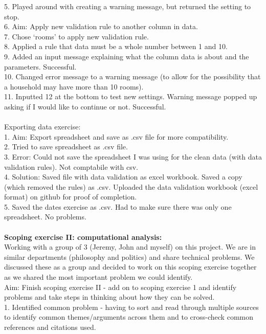 \documentclass{article}
\begin{document}
5. Played around with creating a warning message, but returned the setting to stop. \\
6. Aim: Apply new validation rule to another column in data.\\
7. Chose ‘rooms’ to apply new validation rule. \\
8. Applied a rule that data must be a whole number between 1 and 10.\\
9. Added an input message explaining what the column data is about and the parameters. Successful.\\
10. Changed error message to a warning message (to allow for the possibility that a household may have more than 10 rooms). \\
11. Inputted 12 at the bottom to test new settings. Warning message popped up asking if I would like to continue or not. Successful.\\
\\
Exporting data exercise:\\
1. Aim: Export spreadsheet and save as .csv file for more compatibility.\\
2. Tried to save spreadsheet as .csv file.\\
3. Error: Could not save the spreadsheet I was using for the clean data (with data validation rules). Not comptabile with csv.\\
4. Solution: Saved file with data validation as excel workbook. Saved a copy (which removed the rules) as .csv. Uploaded the data validation workbook (excel format) on github for proof of completion.\\
5. Saved the dates exercise as .csv. Had to make sure there was only one spreadsheet. No problems.\\
\\
\textbf{Scoping exercise II: computational analysis:}\\
Working with a group of 3 (Jeremy, John and myself)  on this project. We are in similar departments (philosophy and politics) and share  technical problems. We discussed these as a group and decided to work on this scoping exercise together as we shared the most important problem we could identify. \\
Aim: Finish scoping exercise II - add on to scoping exercise 1 and identify problems and take steps in thinking about how they can be solved. \\
1. Identified common problem - having to sort and read through multiple sources to identify common themes/arguments across them and to cross-check common references and citations used.  \\
\end{document}
